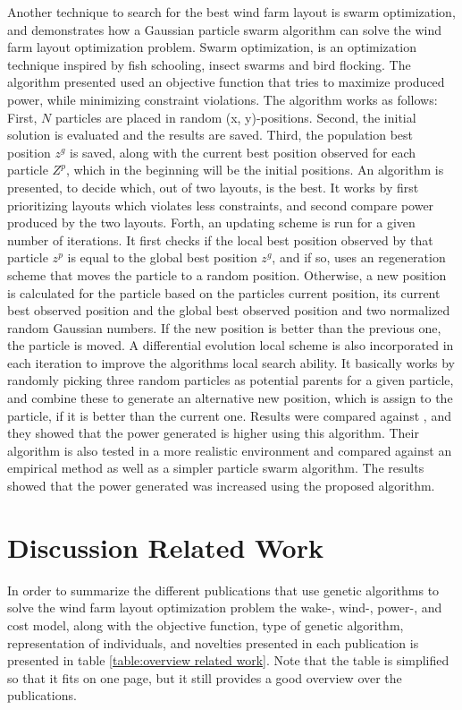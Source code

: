 \noindent Another technique to search for the best wind farm layout is swarm optimization, and \cite{Wan2012} demonstrates how a Gaussian particle swarm algorithm can solve the wind farm layout optimization problem. Swarm optimization, is an optimization technique inspired by fish schooling, insect swarms and bird flocking. The algorithm presented used an objective function that tries to maximize produced power, while minimizing constraint violations. The algorithm works as follows: First, $N$ particles are placed in random (x, y)-positions. Second, the initial solution is evaluated and the results are saved. Third, the population best position $z^g$ is saved, along with the current best position observed for each particle $Z^p$, which in the beginning will be the initial positions. An algorithm is presented, to decide which, out of two layouts, is the best. It works by first prioritizing layouts which violates less constraints, and second compare power produced by the two layouts. Forth, an updating scheme is run for a given number of iterations. It first checks if the local best position observed by that particle $z^p$ is equal to the global best position $z^g$, and if so, uses an regeneration scheme that moves the particle to a random position. Otherwise, a new position is calculated for the particle based on the particles current position, its current best observed position and the global best observed position and two normalized random Gaussian numbers. If the new position is better than the previous one, the particle is moved. A differential evolution local scheme is also incorporated in each iteration to improve the algorithms local search ability. It basically works by randomly picking three random particles as potential parents for a given particle, and combine these to generate an alternative new position, which is assign to the particle, if it is better than the current one. Results were compared against \citep{Grady}, and they showed that the power generated is higher using this algorithm. Their algorithm is also tested in a more realistic environment and compared against an empirical method as well as a simpler particle swarm algorithm. The results showed that the power generated was increased using the proposed algorithm.\\


\section{Discussion Related Work}\label{section:relatedworkdiscussion}
In order to summarize the different publications that use genetic algorithms to solve the wind farm layout optimization problem the wake-, wind-, power-, and cost model, along with the objective function, type of genetic algorithm, representation of individuals, and novelties presented in each publication is presented in table \ref{table:overview related work}. Note that the table is simplified so that it fits on one page, but it still provides a good overview over the publications. \\

